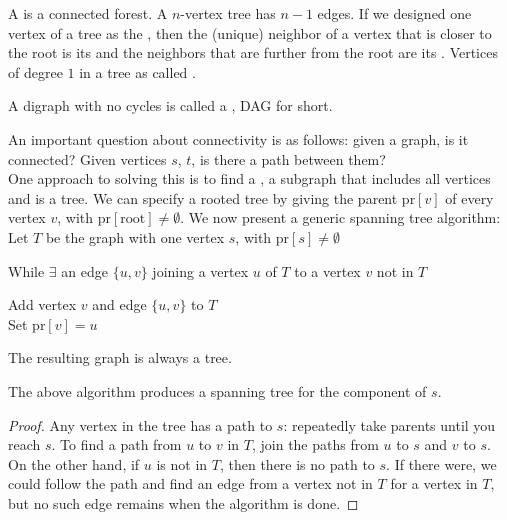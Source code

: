 \documentclass[12pt]{scrartcl}
\begin{document}
\begin{definition}
    A  is a connected forest. A $n$-vertex tree has $n-1$ edges. If we designed one vertex of a tree as the , then the (unique) neighbor of a vertex that is closer to the root is its  and the neighbors that are further from the root are its . Vertices of degree $1$ in a tree as called .
\end{definition}

\begin{definition}
    A digraph with no cycles is called a , DAG for short.
\end{definition}

An important question about connectivity is as follows: given a graph, is it connected? Given vertices $s$, $t$, is there a path between them? \\

One approach to solving this is to find a , a subgraph that includes all vertices and is a tree. We can specify a rooted tree by giving the parent $\text{pr}[v]$ of every vertex $v$, with $\text{pr}[\text{root}] \neq \emptyset$. We now present a generic spanning tree algorithm: \\

Let $T$ be the graph with one vertex $s$, with $\text{pr}[s] \neq \emptyset$

\hspace{2mm} While $\exists$ an edge $\{u, v\}$ joining a vertex $u$ of $T$ to a vertex $v$ not in $T$

\hspace{4mm} Add vertex $v$ and edge $\{u, v\}$ to $T$ \\

\hspace{4mm}
Set $\text{pr}[v] = u$


The resulting graph is always a tree. 

\begin{lemma}
The above algorithm produces a spanning tree for the component of $s$.    
\end{lemma}

\begin{proof}
    Any vertex in the tree has a path to $s$: repeatedly take parents until you reach $s$. To find a path from $u$ to $v$ in $T$, join the paths from $u$ to $s$ and $v$ to $s$. On the other hand, if $u$ is not in $T$, then there is no path to $s$. If there were, we could follow the path and find an edge from a vertex not in $T$ for a vertex in $T$, but no such edge remains when the algorithm is done.
\end{proof}
\end{document}
